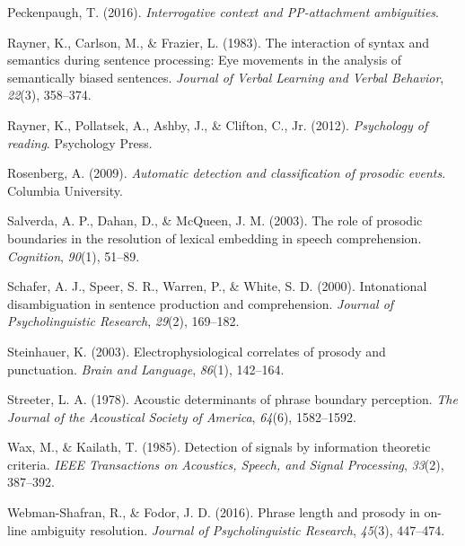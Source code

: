 \documentclass[12pt,oneside]{book}
\begin{document}
\leavevmode\hypertarget{ref-qp2}{}%
Peckenpaugh, T. (2016). \emph{Interrogative context and PP-attachment ambiguities}.

\leavevmode\hypertarget{ref-raynerEtAl1983}{}%
Rayner, K., Carlson, M., \& Frazier, L. (1983). The interaction of syntax and semantics during sentence processing: Eye movements in the analysis of semantically biased sentences. \emph{Journal of Verbal Learning and Verbal Behavior}, \emph{22}(3), 358--374.

\leavevmode\hypertarget{ref-rayner2012psychology}{}%
Rayner, K., Pollatsek, A., Ashby, J., \& Clifton, C., Jr. (2012). \emph{Psychology of reading}. Psychology Press.

\leavevmode\hypertarget{ref-andrew}{}%
Rosenberg, A. (2009). \emph{Automatic detection and classification of prosodic events}. Columbia University.

\leavevmode\hypertarget{ref-salverda2003role}{}%
Salverda, A. P., Dahan, D., \& McQueen, J. M. (2003). The role of prosodic boundaries in the resolution of lexical embedding in speech comprehension. \emph{Cognition}, \emph{90}(1), 51--89.

\leavevmode\hypertarget{ref-schafer2000intonational}{}%
Schafer, A. J., Speer, S. R., Warren, P., \& White, S. D. (2000). Intonational disambiguation in sentence production and comprehension. \emph{Journal of Psycholinguistic Research}, \emph{29}(2), 169--182.

\leavevmode\hypertarget{ref-p600addscps}{}%
Steinhauer, K. (2003). Electrophysiological correlates of prosody and punctuation. \emph{Brain and Language}, \emph{86}(1), 142--164.

\leavevmode\hypertarget{ref-streeter1978acoustic}{}%
Streeter, L. A. (1978). Acoustic determinants of phrase boundary perception. \emph{The Journal of the Acoustical Society of America}, \emph{64}(6), 1582--1592.

\leavevmode\hypertarget{ref-wax1985detection}{}%
Wax, M., \& Kailath, T. (1985). Detection of signals by information theoretic criteria. \emph{IEEE Transactions on Acoustics, Speech, and Signal Processing}, \emph{33}(2), 387--392.

\leavevmode\hypertarget{ref-webman2016phrase}{}%
Webman-Shafran, R., \& Fodor, J. D. (2016). Phrase length and prosody in on-line ambiguity resolution. \emph{Journal of Psycholinguistic Research}, \emph{45}(3), 447--474.
\end{document}
